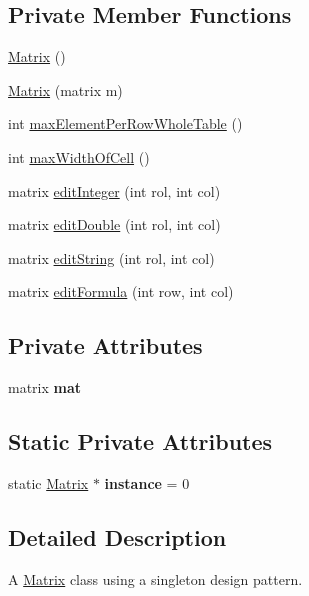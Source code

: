 \subsection*{Private Member Functions}
\begin{DoxyCompactItemize}
\item 
\hyperlink{class_matrix_a2dba13c45127354c9f75ef576f49269b}{Matrix} ()
\item 
\hyperlink{class_matrix_abc64f3d5a4f22323a24be2bfabf377cb}{Matrix} (matrix m)
\item 
int \hyperlink{class_matrix_a8620c5426a31cf8fe0072df32bb3f65d}{max\+Element\+Per\+Row\+Whole\+Table} ()
\item 
int \hyperlink{class_matrix_a60dac9b70e73a12d2adb32d6be9ff65d}{max\+Width\+Of\+Cell} ()
\item 
matrix \hyperlink{class_matrix_a91c66e2961a16adf56b8d58b916d2d46}{edit\+Integer} (int rol, int col)
\item 
matrix \hyperlink{class_matrix_a147d3813e96ef757fb0d5ff65e5f97ef}{edit\+Double} (int rol, int col)
\item 
matrix \hyperlink{class_matrix_a7029d8a3cd3c691b46adfd777abc880c}{edit\+String} (int rol, int col)
\item 
matrix \hyperlink{class_matrix_af3d26e46fcec1a98380b1af04f008f22}{edit\+Formula} (int row, int col)
\end{DoxyCompactItemize}
\subsection*{Private Attributes}
\begin{DoxyCompactItemize}
\item 
\mbox{\label{class_matrix_a1b0c75c45092426431308172aab92c66}} 
matrix {\bfseries mat}
\end{DoxyCompactItemize}
\subsection*{Static Private Attributes}
\begin{DoxyCompactItemize}
\item 
\mbox{\label{class_matrix_adbe13eefa6a6ea2f02f45da26400f22e}} 
static \hyperlink{class_matrix}{Matrix} $\ast$ {\bfseries instance} = 0
\end{DoxyCompactItemize}


\subsection{Detailed Description}
A \hyperlink{class_matrix}{Matrix} class using a singleton design pattern. 


